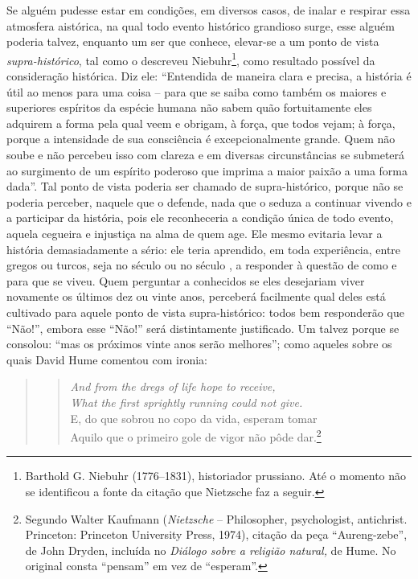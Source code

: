 Se alguém pudesse estar em condições, em diversos casos, de inalar e
respirar essa atmosfera aistórica, na qual todo evento histórico
grandioso surge, esse alguém poderia talvez, enquanto um ser que
conhece, elevar-se a um ponto de vista \emph{supra-histórico}, tal como
o descreveu Niebuhr\footnote{Barthold G. Niebuhr (1776--1831),
  historiador prussiano. Até o momento não se identificou a fonte da
  citação que Nietzsche faz a seguir.}, como resultado possível da
consideração histórica. Diz ele: ``Entendida de maneira clara e precisa,
a história é útil ao menos para uma coisa -- para que se saiba como também
os maiores e superiores espíritos da espécie humana não sabem quão
fortuitamente eles adquirem a forma pela qual veem e obrigam, à força,
que todos vejam; à força, porque a intensidade de sua consciência é
excepcionalmente grande. Quem não soube e não percebeu isso com clareza e em diversas
circunstâncias se submeterá ao surgimento de um espírito poderoso que
imprima a maior paixão a uma forma dada''. Tal ponto de vista poderia
ser chamado de supra-histórico, porque não se poderia perceber, naquele
que o defende, nada que o seduza a continuar vivendo e a participar da
história, pois ele reconheceria a condição única de todo evento, aquela
cegueira e injustiça na alma de quem age. Ele mesmo evitaria levar a
história demasiadamente a sério: ele teria aprendido, em toda
experiência, entre gregos ou turcos, seja no século  ou no século ,
a responder à questão de como e para que se viveu. Quem perguntar a
conhecidos se eles desejariam viver novamente os últimos dez ou vinte
anos, perceberá facilmente qual deles está cultivado para aquele ponto
de vista supra-histórico: todos bem responderão que ``Não!'', embora
esse ``Não!'' será distintamente justificado. Um talvez porque se
consolou: ``mas os próximos vinte anos serão melhores''; como aqueles
sobre os quais David Hume comentou com ironia:

\begin{quote}
\begin{verse}
\emph{And from the dregs of life hope to receive,}\\
\emph{What the first sprightly running could not give.}\\
E, do que sobrou no copo da vida,\qb{} esperam tomar\\
Aquilo que o primeiro gole de vigor\qb{} não pôde dar.\footnote{Segundo
  Walter Kaufmann (\emph{Nietzsche} -- Philosopher, psychologist,
  antichrist. Princeton: Princeton University Press, 1974),
  citação da peça ``Aureng-zebe'', de John Dryden, incluída no
  \emph{Diálogo sobre a religião natural,} de Hume. No original consta
  ``pensam'' em vez de ``esperam''.}
\end{verse}
\end{quote}

